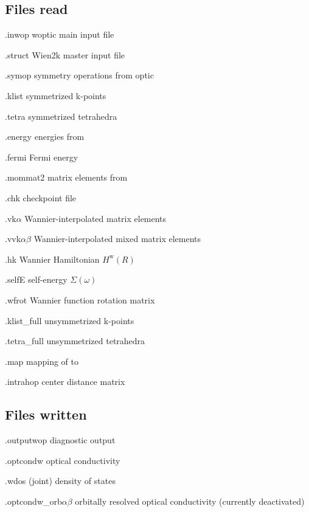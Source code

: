 \subsection{Files read}
\begin{options}
\item [\case.inwop] woptic main input file 
\item [\case.struct] Wien2k master input file 
\item [\case.symop] symmetry operations from optic 
\item [\case.klist] symmetrized k-points 
\item [\case.tetra] symmetrized tetrahedra 
\item [\case.energy] energies from \lapwi
\item [\case.fermi] Fermi energy
\item [\case.mommat2] matrix elements from \optic
\item [\case.chk] \wannier checkpoint file 
\item [\case.vk$α$] Wannier-interpolated matrix elements
\item [\case.vvk$αβ$] Wannier-interpolated mixed matrix elements
\item [\case.hk] Wannier Hamiltonian $H^\text{w}(R)$
\item [\case.selfE] self-energy $Σ(ω)$ 
\item [\case.wfrot] Wannier function rotation matrix 
\item [\case.klist\_full] unsymmetrized k-points
\item [\case.tetra\_full] unsymmetrized tetrahedra 
\item [\case.map] mapping of  to 
\item [\case.intrahop] \wf center distance matrix 
\end{options}

\subsection{Files written}
\begin{options}
\item[\case.outputwop] diagnostic output 
\item[\case.optcondw] optical conductivity 
\item[\case.wdos] (joint) density of states 
\item[\lvir \case.optcondw\_orb$αβ$] orbitally resolved optical
  conductivity  (currently deactivated)
\end{options}

